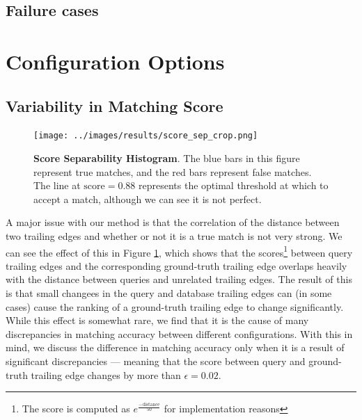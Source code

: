\subsection{Failure cases}


\section{Configuration Options}

\subsection{Variability in Matching Score}

\begin{figure}[t]%
\centering
\texttt{[image: ../images/results/score\_sep\_crop.png]}
\caption{\textbf{Score Separability Histogram}. The blue bars in this figure represent true matches, and the red bars represent false matches. The line at $\text{score} = 0.88$ represents the optimal threshold at which to accept a match, although we can see it is not perfect.}
\label{fig:score_sep}
\end{figure}

A major issue with our method is that the correlation of the distance between two trailing edges and whether or not it is a true match is not very strong.
We can see the effect of this in Figure \ref{fig:score_sep}, which shows that the scores\footnote{The score is computed as $e^{\frac{-\text{distance}}{50}}$ for implementation reasons} between query trailing edges and the corresponding ground-truth trailing edge overlaps heavily with the distance between queries and unrelated trailing edges.
The result of this is that small changees in the query and database trailing edges can (in some cases) cause the ranking of a ground-truth trailing edge to change significantly.
While this effect is somewhat rare, we find that it is the cause of many discrepancies in matching accuracy between different configurations.
With this in mind, we discuss the difference in matching accuracy only when it is a result of significant discrepancies --- meaning that the score between query and ground-truth trailing edge changes by more than $\epsilon = 0.02$. %

